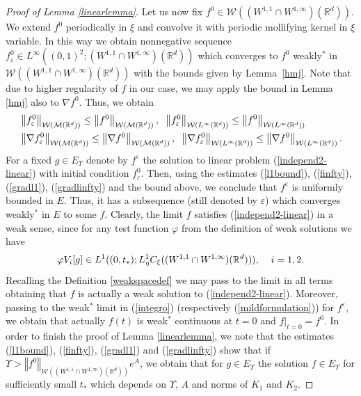 \documentclass[10pt]{article}
\newcommand{\hd}{\hspace{0.2cm}}
\newcommand*{\norm}[1]{\left\Vert{#1}\right\Vert}
\newcommand{\vf}{\varphi}
\newcommand{\ve}{\varepsilon}
\newcommand{\R}{\mathbb{R}}
\newcommand{\W}{\mathcal{W}}
\begin{document}
\begin{proof}[Proof of Lemma \ref{linearlemma}]
 
Let us now fix $f^0 \in \W((W^{1,1}\cap W^{1,\infty})(\R^d))$. We extend $f^0$ periodically in $\xi$ and convolve it with periodic mollifying kernel in $\xi$ variable. In this way we obtain nonnegative  sequence $f_{\ve}^0  \in L^{\infty}((0,1)^2;(W^{1,1}\cap W^{1,\infty})(\R^d))$ which converges to $f^0$ weakly$^*$ in $\W((W^{1,1}\cap W^{1,\infty})(\R^d))$ with the bounds given by Lemma~\ref{hmj}. Note that due to higher regularity of $f$ in our case, we may apply the bound in Lemma \ref{hmj} also to $\nabla f^0$. Thus, we obtain
\begin{align*}
&\norm{f^0_{\ve}}_{\W(\mathcal{M}(\R^d))} \leq \norm{f^0}_{\W(\mathcal{M}(\R^d))}, \hd \norm{f^0_{\ve}}_{\W(L^{\infty}(\R^d))} \leq \norm{f^0}_{\W(L^{\infty}(\R^d))}\\
&\norm{\nabla f^0_{\ve}}_{\W(\mathcal{M}(\R^d))} \leq \norm{\nabla f^0}_{\W(\mathcal{M}(\R^d))}, \hd \norm{\nabla f^0_{\ve}}_{\W(L^{\infty}(\R^d))} \leq \norm{\nabla f^0}_{\W(L^{\infty}(\R^d))}.
\end{align*}
For a fixed $g \in E_{\Upsilon}$ denote by $f^\ve$ the solution to linear problem (\ref{independ2-linear}) with initial condition $f^0_\ve$. Then, using the estimates (\ref{l1bound}), (\ref{finfty}), (\ref{gradl1}), (\ref{gradlinfty}) and the bound above, we conclude that $f^\ve$ is uniformly bounded in $E$. Thus, it has a subsequence (still denoted by $\ve$) which converges weakly$^*$ in $E$ to some $f$. Clearly, the limit $f$ satisfies (\ref{independ2-linear}) in a weak sense, since for any test function $\vf$ from the definition of weak solutions we have
\[
\vf V_{i}[g] \in L^{1}((0,t_{*});L^{1}_{\eta}C_{\xi}((W^{1,1}\cap W^{1,\infty})(\R^d))), \hd \hd i = 1,2.
\]
Recalling the Definition \ref{weakspacedef}  we may pass to the limit in all terms obtaining that $f$ is actually a weak solution to (\ref{independ2-linear}). Moreover, passing to the weak$^*$ limit in (\ref{integro}) (respectively (\ref{mildformulation})) for $f^\ve$, we obtain that actually $f(t)$ is weak$^*$ continuous at $t=0$ and $f|_{t=0} = f^0$.
In order to finish the proof of Lemma \ref{linearlemma}, we note that the estimates (\ref{l1bound}), (\ref{finfty}), (\ref{gradl1}) and (\ref{gradlinfty}) show that if $\Upsilon> \norm{f^0}_{\W((W^{1,1}\cap W^{1,\infty})(\R^d))}e^{A}$, we obtain that for $g \in E_{\Upsilon}$ the solution $f \in E_{\Upsilon}$ for sufficiently small $t_{*}$ which depends on $\Upsilon$, $A$ and norms of $K_{1}$ and $K_{2}$. 
\end{proof}
\end{document}
